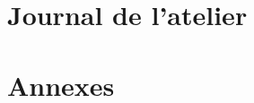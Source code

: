 \documentclass[11pt,oneside]{book}
\begin{document}
\frontmatter




\mainmatter
\part{Journal de l’atelier}







\appendix
\part*{Annexes}


\backmatter
\printbibliography
\end{document}
